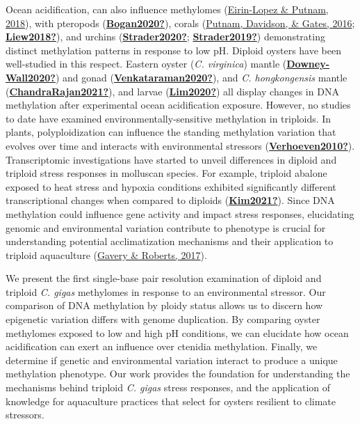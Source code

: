 \documentclass [11pt, proquest] {uwthesis}[2015/03/03]
\begin{document}
Ocean acidification, can also influence methylomes (\protect\hyperlink{ref-Eirin-Lopez2018}{Eirin-Lopez \& Putnam, 2018}), with pteropods (\protect\hyperlink{ref-Bogan2020}{\textbf{Bogan2020?}}), corals (\protect\hyperlink{ref-Putnam2016}{Putnam, Davidson, \& Gates, 2016}; \protect\hyperlink{ref-Liew2018}{\textbf{Liew2018?}}), and urchins (\protect\hyperlink{ref-Strader2020}{\textbf{Strader2020?}}; \protect\hyperlink{ref-Strader2019}{\textbf{Strader2019?}}) demonstrating distinct methylation patterns in response to low pH. Diploid oysters have been well-studied in this respect. Eastern oyster (\emph{C. virginica}) mantle (\protect\hyperlink{ref-Downey-Wall2020}{\textbf{Downey-Wall2020?}}) and gonad (\protect\hyperlink{ref-Venkataraman2020}{\textbf{Venkataraman2020?}}), and \emph{C. hongkongensis} mantle (\protect\hyperlink{ref-ChandraRajan2021}{\textbf{ChandraRajan2021?}}), and larvae (\protect\hyperlink{ref-Lim2020}{\textbf{Lim2020?}}) all display changes in DNA methylation after experimental ocean acidification exposure. However, no studies to date have examined environmentally-sensitive methylation in triploids. In plants, polyploidization can influence the standing methylation variation that evolves over time and interacts with environmental stressors (\protect\hyperlink{ref-Verhoeven2010}{\textbf{Verhoeven2010?}}). Transcriptomic investigations have started to unveil differences in diploid and triploid stress responses in molluscan species. For example, triploid abalone exposed to heat stress and hypoxia conditions exhibited significantly different transcriptional changes when compared to diploids (\protect\hyperlink{ref-Kim2021}{\textbf{Kim2021?}}). Since DNA methylation could influence gene activity and impact stress responses, elucidating genomic and environmental variation contribute to phenotype is crucial for understanding potential acclimatization mechanisms and their application to triploid aquaculture (\protect\hyperlink{ref-Gavery2017}{Gavery \& Roberts, 2017}).

We present the first single-base pair resolution examination of diploid and triploid \emph{C. gigas} methylomes in response to an environmental stressor. Our comparison of DNA methylation by ploidy status allows us to discern how epigenetic variation differs with genome duplication. By comparing oyster methylomes exposed to low and high pH conditions, we can elucidate how ocean acidification can exert an influence over ctenidia methylation. Finally, we determine if genetic and environmental variation interact to produce a unique methylation phenotype. Our work provides the foundation for understanding the mechanisms behind triploid \emph{C. gigas} stress responses, and the application of knowledge for aquaculture practices that select for oysters resilient to climate stressors.
\end{document}
